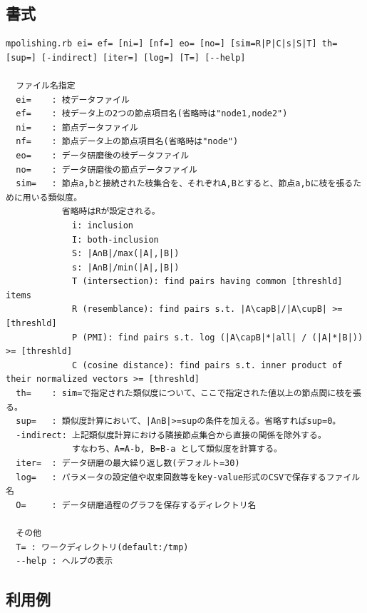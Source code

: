 \subsection{書式}
\begin{verbatim}
mpolishing.rb ei= ef= [ni=] [nf=] eo= [no=] [sim=R|P|C|s|S|T] th= [sup=] [-indirect] [iter=] [log=] [T=] [--help]

  ファイル名指定
  ei=    : 枝データファイル
  ef=    : 枝データ上の2つの節点項目名(省略時は"node1,node2")
  ni=    : 節点データファイル
  nf=    : 節点データ上の節点項目名(省略時は"node")
  eo=    : データ研磨後の枝データファイル
  no=    : データ研磨後の節点データファイル
  sim=   : 節点a,bと接続された枝集合を、それぞれA,Bとすると、節点a,bに枝を張るために用いる類似度。
           省略時はRが設定される。
             i: inclusion
             I: both-inclusion
             S: |A∩B|/max(|A|,|B|)
             s: |A∩B|/min(|A|,|B|)
             T (intersection): find pairs having common [threshld] items
             R (resemblance): find pairs s.t. |A\capB|/|A\cupB| >= [threshld]
             P (PMI): find pairs s.t. log (|A\capB|*|all| / (|A|*|B|)) >= [threshld]
             C (cosine distance): find pairs s.t. inner product of their normalized vectors >= [threshld]
  th=    : sim=で指定された類似度について、ここで指定された値以上の節点間に枝を張る。
  sup=   : 類似度計算において、|A∩B|>=supの条件を加える。省略すればsup=0。
  -indirect: 上記類似度計算における隣接節点集合から直接の関係を除外する。
             すなわち、A=A-b, B=B-a として類似度を計算する。
  iter=  : データ研磨の最大繰り返し数(デフォルト=30)
  log=   : パラメータの設定値や収束回数等をkey-value形式のCSVで保存するファイル名
  O=     : データ研磨過程のグラフを保存するディレクトリ名

  その他
  T= : ワークディレクトリ(default:/tmp)
  --help : ヘルプの表示
\end{verbatim}

\subsection{利用例}



